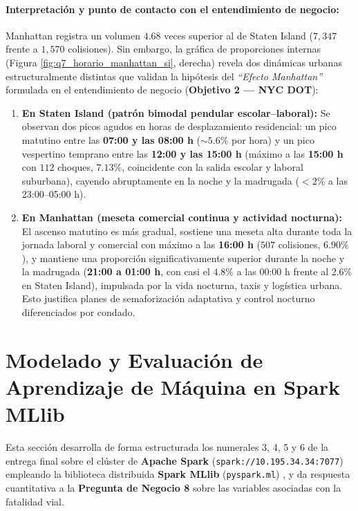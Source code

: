 \documentclass[11pt,a4paper]{article}
\begin{document}
\paragraph{Interpretación y punto de contacto con el entendimiento de negocio:}
Manhattan registra un volumen $4.68$ veces superior al de Staten Island ($7,347$ frente a $1,570$ colisiones). Sin embargo, la gráfica de proporciones internas (Figura \ref{fig:q7_horario_manhattan_si}, derecha) revela dos dinámicas urbanas estructuralmente distintas que validan la hipótesis del \textit{``Efecto Manhattan''} formulada en el entendimiento de negocio (\textbf{Objetivo 2 --- NYC DOT}):
\begin{enumerate}
    \item \textbf{En Staten Island (patrón bimodal pendular escolar--laboral):} Se observan dos picos agudos en horas de desplazamiento residencial: un pico matutino entre las \textbf{07:00 y las 08:00 h} ($\sim 5.6\%$ por hora) y un pico vespertino temprano entre las \textbf{12:00 y las 15:00 h} (máximo a las \textbf{15:00 h} con $112$ choques, $7.13\%$, coincidente con la salida escolar y laboral suburbana), cayendo abruptamente en la noche y la madrugada ($<2\%$ a las 23:00--05:00 h).
    \item \textbf{En Manhattan (meseta comercial continua y actividad nocturna):} El ascenso matutino es más gradual, sostiene una meseta alta durante toda la jornada laboral y comercial con máximo a las \textbf{16:00 h} ($507$ colisiones, $6.90\%$), y mantiene una proporción significativamente superior durante la noche y la madrugada (\textbf{21:00 a 01:00 h}, con casi el $4.8\%$ a las 00:00 h frente al $2.6\%$ en Staten Island), impulsada por la vida nocturna, taxis y logística urbana. Esto justifica planes de semaforización adaptativa y control nocturno diferenciados por condado.
\end{enumerate}



\section{Modelado y Evaluación de Aprendizaje de Máquina en Spark MLlib}
\label{sec:modelado_evaluacion}

Esta sección desarrolla de forma estructurada los numerales 3, 4, 5 y 6 de la entrega final sobre el clúster de \textbf{Apache Spark} (\texttt{spark://10.195.34.34:7077}) empleando la biblioteca distribuida \textbf{Spark MLlib} (\texttt{pyspark.ml}) \cite{meng2016mllib}, y da respuesta cuantitativa a la \textbf{Pregunta de Negocio 8} sobre las variables asociadas con la fatalidad vial.
\end{document}
